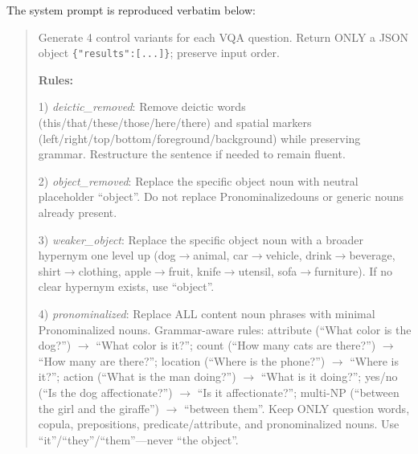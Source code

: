 \documentclass[letterpaper]{article} %
\begin{document}
The system prompt is reproduced verbatim below:

\begin{quote}\small
Generate 4 control variants for each VQA question.
Return ONLY a JSON object \texttt{\{"results":[...]\}}; preserve input order.

\textbf{Rules:}

1) \textit{deictic\_removed}: Remove deictic words (this/that/these/those/here/there)
and spatial markers (left/right/top/bottom/foreground/background) while preserving
grammar. Restructure the sentence if needed to remain fluent.

2) \textit{object\_removed}: Replace the specific object noun with neutral placeholder
``object''. Do not replace Pronominalizedouns or generic nouns already present.

3) \textit{weaker\_object}: Replace the specific object noun with a broader hypernym
one level up (dog$\to$animal, car$\to$vehicle, drink$\to$beverage, shirt$\to$clothing,
apple$\to$fruit, knife$\to$utensil, sofa$\to$furniture). If no clear hypernym
exists, use ``object''.

4) \textit{pronominalized}: Replace ALL content noun phrases with minimal Pronominalized nouns.
Grammar-aware rules: attribute (``What color is the dog?'') $\to$ ``What color is it?'';
count (``How many cats are there?'') $\to$ ``How many are there?'';
location (``Where is the phone?'') $\to$ ``Where is it?'';
action (``What is the man doing?'') $\to$ ``What is it doing?'';
yes/no (``Is the dog affectionate?'') $\to$ ``Is it affectionate?'';
multi-NP (``between the girl and the giraffe'') $\to$ ``between them''.
Keep ONLY question words, copula, prepositions, predicate/attribute, and pronominalized nouns.
Use ``it''/``they''/``them''---never ``the object''.
\end{quote}
\end{document}
